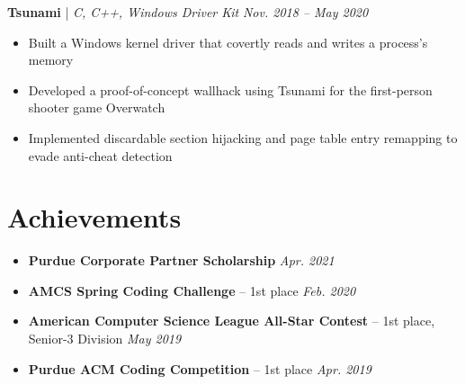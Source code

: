 \documentclass[11pt,letterpaper]{article}
\newcommand{\resumeItemListStart}{
    \begin{itemize}[itemsep=1pt, parsep=0pt, topsep=0pt]
}
\newcommand{\resumeItemListEnd}{
    \end{itemize}
}
\begin{document}
\textbf{Tsunami} | \emph{C, C++, Windows Driver Kit} \hfill \textit {Nov. 2018 -- May 2020}

\resumeItemListStart
    \item Built a Windows kernel driver that covertly reads and writes a process's memory
    \item Developed a proof-of-concept wallhack using Tsunami for the first-person shooter game Overwatch
	\item Implemented discardable section hijacking and page table entry remapping to evade anti-cheat detection
\resumeItemListEnd

\section{Achievements}

\resumeItemListStart
    \item \textbf{Purdue Corporate Partner Scholarship} \hfill \textit{Apr. 2021}
	\item \textbf{AMCS Spring Coding Challenge} -- 1st place \hfill \textit{Feb. 2020}
	\item \textbf{American Computer Science League All-Star Contest} -- 1st place, Senior-3 Division \hfill \textit{May 2019}
	\item \textbf{Purdue ACM Coding Competition} -- 1st place \hfill \textit{Apr. 2019}
\resumeItemListEnd
	
\end{document}
